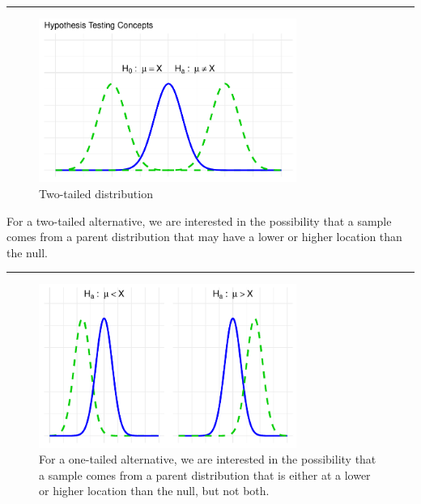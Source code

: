 \documentclass[
  letterpaper,
  DIV=11,
  numbers=noendperiod]{scrartcl}
\begin{document}
\begin{center}\rule{0.5\linewidth}{0.5pt}\end{center}

\begin{figure}

{\centering \includegraphics[width=0.75\textwidth,height=\textheight]{Supplemental_Chapter---Hypothesis-Testing_files/figure-pdf/fig-5-5.twotailed-1.pdf}

}

\caption{\label{fig-5-5.twotailed}Two-tailed distribution}

\end{figure}

For a two-tailed alternative, we are interested in the possibility that
a sample comes from a parent distribution that may have a lower or
higher location than the null.

\begin{center}\rule{0.5\linewidth}{0.5pt}\end{center}

\begin{figure}

{\centering \includegraphics[width=0.75\textwidth,height=\textheight]{Supplemental_Chapter---Hypothesis-Testing_files/figure-pdf/fig-5-5.onetailed-1.pdf}

}

\caption{\label{fig-5-5.onetailed}For a one-tailed alternative, we are
interested in the possibility that a sample comes from a parent
distribution that is either at a lower or higher location than the null,
but not both.}

\end{figure}
\end{document}
